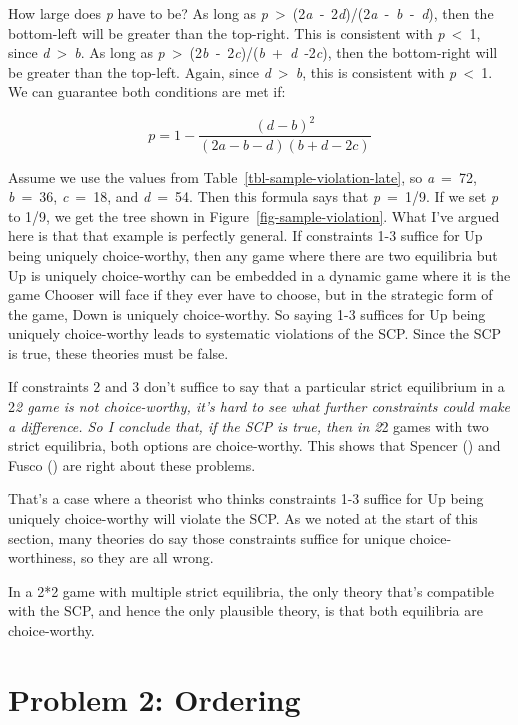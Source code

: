 \documentclass[
  10pt,
  letterpaper,
  DIV=11,
  numbers=noendperiod,
  twoside]{scrartcl}
\begin{document}
How large does \emph{p} have to be? As long as
\emph{p}~\textgreater~(2\emph{a}~‑~2\emph{d})/(2\emph{a}~‑~\emph{b}~‑~\emph{d}),
then the bottom-left will be greater than the top-right. This is
consistent with \emph{p}~\textless~1, since
\emph{d}~\textgreater~\emph{b}. As long as
\emph{p}~\textgreater~(2\emph{b}~‑~2\emph{c})/(\emph{b}~+~\emph{d}~‑2\emph{c}),
then the bottom-right will be greater than the top-left. Again, since
\emph{d}~\textgreater~\emph{b}, this is consistent with
\emph{p}~\textless~1. We can guarantee both conditions are met if:

\[
p = 1 - \frac{(d-b)^2}{(2a-b-d)(b+d-2c)}
\]

Assume we use the values from Table~\ref{tbl-sample-violation-late}, so
\emph{a}~=~72, \emph{b}~=~36, \emph{c}~=~18, and \emph{d}~=~54. Then
this formula says that \emph{p}~=~1/9. If we set \emph{p} to 1/9, we get
the tree shown in Figure~\ref{fig-sample-violation}. What I've argued
here is that that example is perfectly general. If constraints 1-3
suffice for Up being uniquely choice-worthy, then any game where there
are two equilibria but Up is uniquely choice-worthy can be embedded in a
dynamic game where it is the game Chooser will face if they ever have to
choose, but in the strategic form of the game, Down is uniquely
choice-worthy. So saying 1-3 suffices for Up being uniquely
choice-worthy leads to systematic violations of the SCP. Since the SCP
is true, these theories must be false.

If constraints 2 and 3 don't suffice to say that a particular strict
equilibrium in a 2\emph{2 game is not choice-worthy, it's hard to see
what further constraints could make a difference. So I conclude that, if
the SCP is true, then in 2}2 games with two strict equilibria, both
options are choice-worthy. This shows that Spencer
() and Fusco
() are right about these problems.

That's a case where a theorist who thinks constraints 1-3 suffice for Up
being uniquely choice-worthy will violate the SCP. As we noted at the
start of this section, many theories do say those constraints suffice
for unique choice-worthiness, so they are all wrong.

In a 2*2 game with multiple strict equilibria, the only theory that's
compatible with the SCP, and hence the only plausible theory, is that
both equilibria are choice-worthy.

\section{Problem 2: Ordering}\label{sec-ordering}
\end{document}
